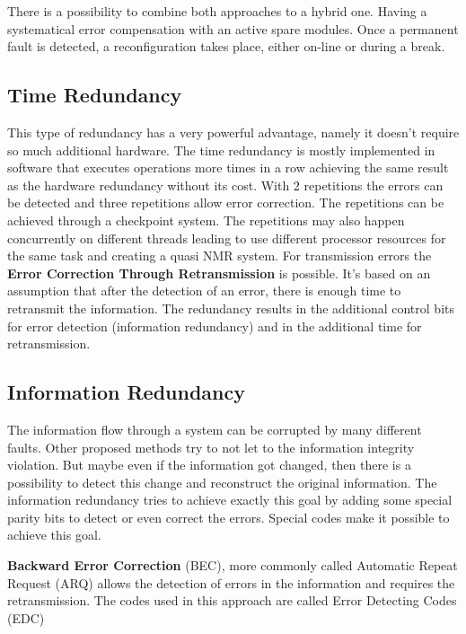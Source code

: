 There is a possibility to combine both approaches to a hybrid one. Having a systematical error compensation with an active spare modules. Once a permanent fault is detected, a reconfiguration takes place, either on-line or during a break.


\subsection{Time Redundancy}
This type of redundancy has a very powerful advantage, namely it doesn't require so much additional hardware. The time redundancy is mostly implemented in software that executes operations more times in a row achieving the same result as the hardware redundancy without its cost. With 2 repetitions the errors can be detected and three repetitions allow error correction. The repetitions can be achieved through a checkpoint system. The repetitions may also happen concurrently on different threads leading to use different processor resources for the same task and creating a quasi NMR system. For transmission errors the \textbf{Error Correction Through Retransmission} is possible. It's based on an assumption that after the detection of an error, there is enough time to retransmit the information. The redundancy results in the additional control bits for error detection (information redundancy) and in the additional time for retransmission.

\subsection{Information Redundancy}\label{ssec:Infred}
The information flow through a system can be corrupted by many different faults. Other proposed methods try to not let to the information integrity violation. But maybe even if the information got changed, then there is a possibility to detect this change and reconstruct the original information. The information redundancy tries to achieve exactly this goal by adding some special parity bits to detect or even correct the errors. Special codes make it possible to achieve this goal.

\textbf{Backward Error Correction} (BEC), more commonly called Automatic Repeat Request (ARQ) allows the detection of errors in the information and requires the retransmission. The codes used in this approach are called Error Detecting Codes (EDC)


